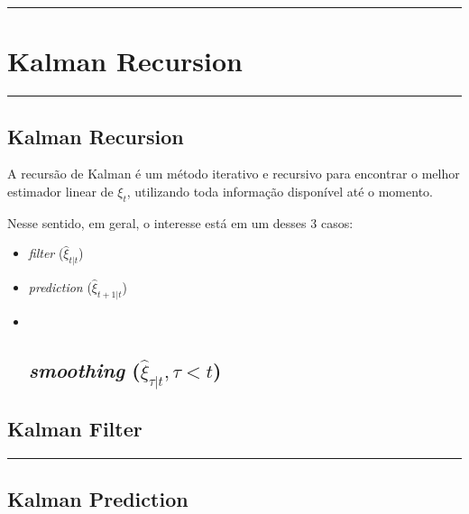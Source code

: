 \documentclass[
  letterpaper,
  DIV=11,
  numbers=noendperiod]{scrartcl}
\begin{document}
\begin{center}\rule{0.5\linewidth}{0.5pt}\end{center}

\section{Kalman Recursion}\label{sec-kalman-recursion}

\begin{center}\rule{0.5\linewidth}{0.5pt}\end{center}

\subsection{Kalman Recursion}\label{kalman-recursion}

A recursão de Kalman é um método iterativo e recursivo para encontrar o
melhor estimador linear de \(\xi_t\), utilizando toda informação
disponível até o momento.

Nesse sentido, em geral, o interesse está em um desses 3 casos:

\begin{itemize}
\item
  \emph{filter} (\(\hat\xi_{t|t}\))
\item
  \emph{prediction} (\(\hat\xi_{t+1|t}\))
\item ~
  \subsection{\texorpdfstring{\emph{smoothing}
  (\(\hat\xi_{\tau|t}, \tau < t\))}{smoothing (\textbackslash hat\textbackslash xi\_\{\textbackslash tau\textbar t\}, \textbackslash tau \textless{} t)}}\label{smoothing-hatxi_taut-tau-t}
\end{itemize}

\subsection{Kalman Filter}\label{sec-kalman-filter}

\begin{center}\rule{0.5\linewidth}{0.5pt}\end{center}

\subsection{Kalman Prediction}\label{sec-kalman-prediction}
\end{document}
